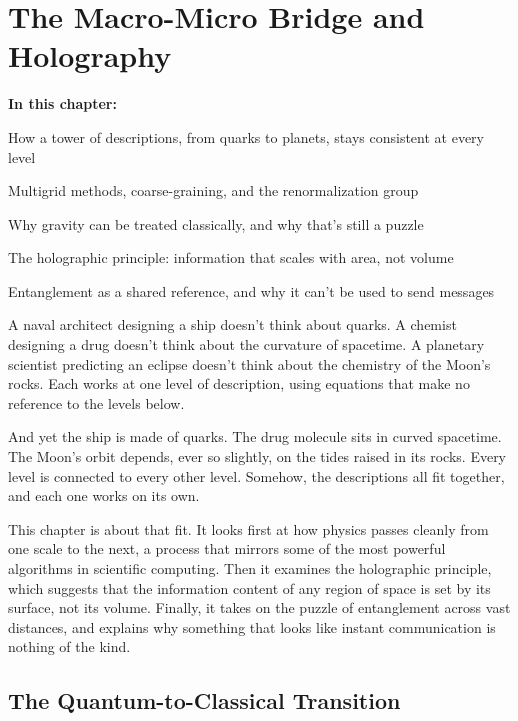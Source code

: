 \chapter{The Macro-Micro Bridge and Holography}

\begin{chaptermapbox}
\textbf{In this chapter:}
\begin{compactchecklist}
\item How a tower of descriptions, from quarks to planets, stays consistent at every level
\item Multigrid methods, coarse-graining, and the renormalization group
\item Why gravity can be treated classically, and why that's still a puzzle
\item The holographic principle: information that scales with area, not volume
\item Entanglement as a shared reference, and why it can't be used to send messages
\end{compactchecklist}
\end{chaptermapbox}

A naval architect designing a ship doesn't think about quarks. A chemist designing a drug doesn't think about the curvature of spacetime. A planetary scientist predicting an eclipse doesn't think about the chemistry of the Moon's rocks. Each works at one level of description, using equations that make no reference to the levels below.

And yet the ship is made of quarks. The drug molecule sits in curved spacetime. The Moon's orbit depends, ever so slightly, on the tides raised in its rocks. Every level is connected to every other level. Somehow, the descriptions all fit together, and each one works on its own.

This chapter is about that fit. It looks first at how physics passes cleanly from one scale to the next, a process that mirrors some of the most powerful algorithms in scientific computing. Then it examines the holographic principle, which suggests that the information content of any region of space is set by its surface, not its volume. Finally, it takes on the puzzle of entanglement across vast distances, and explains why something that looks like instant communication is nothing of the kind.

\section{The Quantum-to-Classical Transition}

